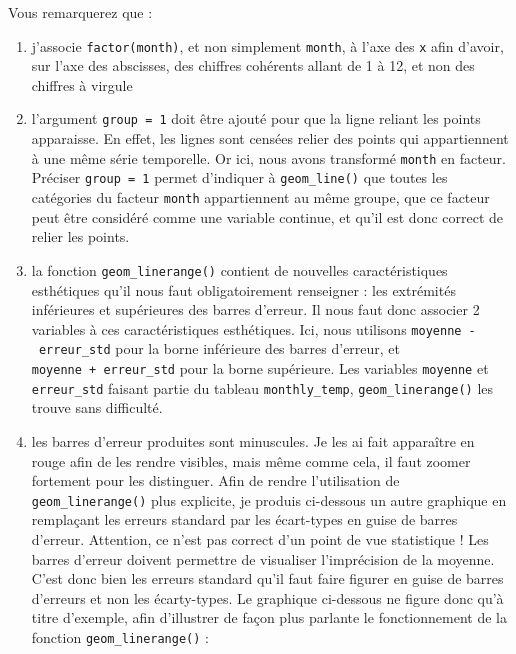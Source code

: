 \documentclass[a4paperpaper,]{article}
\providecommand{\tightlist}{%
  \setlength{\itemsep}{0pt}\setlength{\parskip}{0pt}}
\begin{document}
Vous remarquerez que :

\begin{enumerate}
\def\labelenumi{\arabic{enumi}.}
\tightlist
\item
  j'associe \texttt{factor(month)}, et non simplement \texttt{month}, à l'axe des \texttt{x} afin d'avoir, sur l'axe des abscisses, des chiffres cohérents allant de 1 à 12, et non des chiffres à virgule
\item
  l'argument \texttt{group\ =\ 1} doit être ajouté pour que la ligne reliant les points apparaisse. En effet, les lignes sont censées relier des points qui appartiennent à une même série temporelle. Or ici, nous avons transformé \texttt{month} en facteur. Préciser \texttt{group\ =\ 1} permet d'indiquer à \texttt{geom\_line()} que toutes les catégories du facteur \texttt{month} appartiennent au même groupe, que ce facteur peut être considéré comme une variable continue, et qu'il est donc correct de relier les points.
\item
  la fonction \texttt{geom\_linerange()} contient de nouvelles caractéristiques esthétiques qu'il nous faut obligatoirement renseigner : les extrémités inférieures et supérieures des barres d'erreur. Il nous faut donc associer 2 variables à ces caractéristiques esthétiques. Ici, nous utilisons \texttt{moyenne\ -\ erreur\_std} pour la borne inférieure des barres d'erreur, et \texttt{moyenne\ +\ erreur\_std} pour la borne supérieure. Les variables \texttt{moyenne} et \texttt{erreur\_std} faisant partie du tableau \texttt{monthly\_temp}, \texttt{geom\_linerange()} les trouve sans difficulté.
\item
  les barres d'erreur produites sont minuscules. Je les ai fait apparaître en rouge afin de les rendre visibles, mais même comme cela, il faut zoomer fortement pour les distinguer. Afin de rendre l'utilisation de \texttt{geom\_linerange()} plus explicite, je produis ci-dessous un autre graphique en remplaçant les erreurs standard par les écart-types en guise de barres d'erreur. Attention, ce n'est pas correct d'un point de vue statistique ! Les barres d'erreur doivent permettre de visualiser l'imprécision de la moyenne. C'est donc bien les erreurs standard qu'il faut faire figurer en guise de barres d'erreurs et non les écarty-types. Le graphique ci-dessous ne figure donc qu'à titre d'exemple, afin d'illustrer de façon plus parlante le fonctionnement de la fonction \texttt{geom\_linerange()} :
\end{enumerate}
\end{document}
